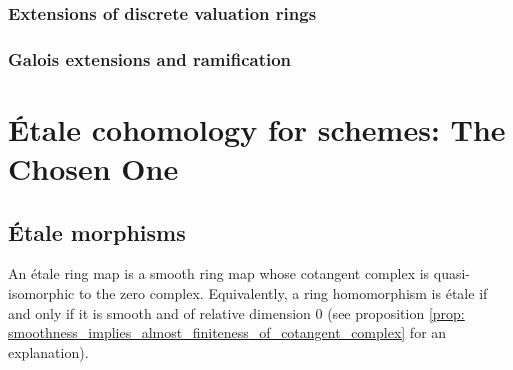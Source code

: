             \subsubsection{Extensions of discrete valuation rings}
                
            
            \subsubsection{Galois extensions and ramification}
    
    \section{\'Etale cohomology for schemes: The Chosen One}
        \subsection{\'Etale morphisms} %
            \begin{definition} \label{def: etale_morphisms} 
                An \'etale ring map is a smooth ring map whose cotangent complex is quasi-isomorphic to the zero complex. Equivalently, a ring homomorphism is \'etale if and only if it is smooth and of relative dimension $0$ (see proposition \ref{prop: smoothness_implies_almost_finiteness_of_cotangent_complex} for an explanation). 
            \end{definition}
            
